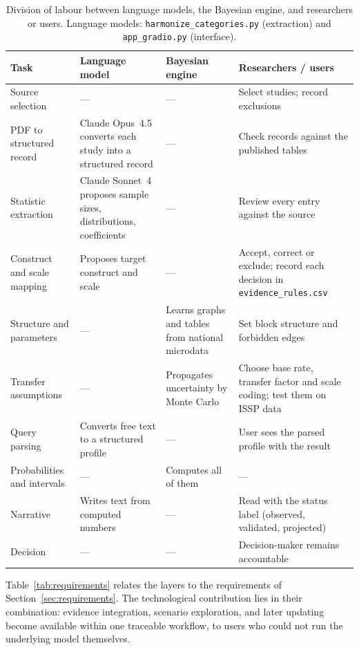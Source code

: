 \begin{table}[htbp]
\centering
\caption{Division of labour between language models, the Bayesian engine,
and researchers or users. Language models: \texttt{harmonize\_categories.py}
(extraction) and \texttt{app\_gradio.py} (interface).}
\label{tab:labour}
\small
\begin{tabularx}{\textwidth}{>{\raggedright\arraybackslash}p{2.6cm}XXX}
\toprule
\textbf{Task} & \textbf{Language model} & \textbf{Bayesian engine} &
  \textbf{Researchers / users} \\
\midrule
Source selection & --- & --- & Select studies; record exclusions \\
PDF to structured record & Claude Opus~4.5 converts each study into a
  structured record & --- & Check records against the published tables \\
Statistic extraction & Claude Sonnet~4 proposes sample sizes, distributions,
  coefficients & --- & Review every entry against the source \\
Construct and scale mapping & Proposes target construct and scale &
  --- & Accept, correct or exclude; record each decision in
  \texttt{evidence\_rules.csv} \\
Structure and parameters & --- & Learns graphs and tables from national
  microdata & Set block structure and forbidden edges \\
Transfer assumptions & --- & Propagates uncertainty by Monte Carlo & Choose
  base rate, transfer factor and scale coding; test them on ISSP data \\
Query parsing & Converts free text to a structured profile & --- & User sees
  the parsed profile with the result \\
Probabilities and intervals & --- & Computes all of them & --- \\
Narrative & Writes text from computed numbers & --- & Read with the status
  label (observed, validated, projected) \\
Decision & --- & --- & Decision-maker remains accountable \\
\bottomrule
\end{tabularx}
\end{table}

Table~\ref{tab:requirements} relates the layers to the requirements of
Section~\ref{sec:requirements}. The technological contribution lies in their
combination: evidence integration, scenario exploration, and later updating
become available within one traceable workflow, to users who could not run the
underlying model themselves.

